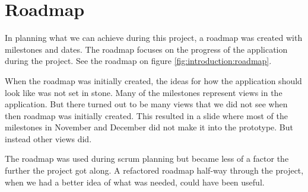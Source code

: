 \section{Roadmap}
In planning what we can achieve during this project, a roadmap was created with milestones and dates. 
The roadmap focuses on the progress of the application during the project. 
See the roadmap on figure \ref{fig:introduction:roadmap}.

When the roadmap was initially created, the ideas for how the application should look like was not set in stone.
Many of the milestones represent views in the application.
But there turned out to be many views that we did not see when then roadmap was initially created.
This resulted in a slide where most of the milestones in  November and December did not make it into the prototype.
But instead other views did.

The roadmap was used during \gls{scrum} planning but became less of a factor the further the project got along. A refactored roadmap half-way through the project, when we had a better idea of what was needed, could have been useful.



